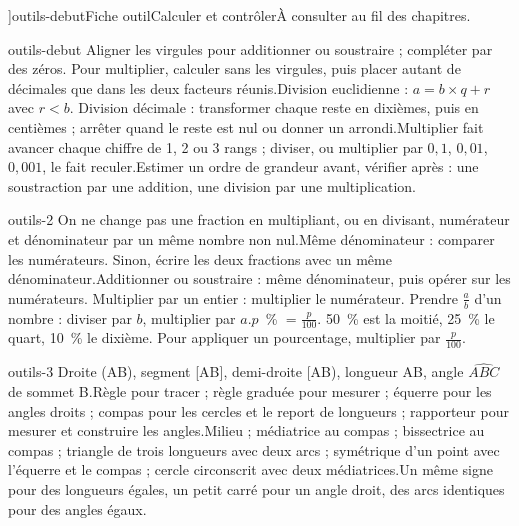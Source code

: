 \editionPage[\pdfbookmark[0]{Fiches outils}{bm-outils-debut-parent}]{outils-debut}{Fiche outil}{Calculer et contrôler}{À consulter au fil des chapitres.}
\begin{blocEdition}{outils-debut}
Aligner les virgules pour additionner ou soustraire ; compléter par des zéros. Pour multiplier, calculer sans les virgules, puis placer autant de décimales que dans les deux facteurs réunis.Division euclidienne : $a=b\times q+r$ avec $r<b$. Division décimale : transformer chaque reste en dixièmes, puis en centièmes ; arrêter quand le reste est nul ou donner un arrondi.Multiplier fait avancer chaque chiffre de 1, 2 ou 3 rangs ; diviser, ou multiplier par $0{,}1$, $0{,}01$, $0{,}001$, le fait reculer.Estimer un ordre de grandeur avant, vérifier après : une soustraction par une addition, une division par une multiplication.
\end{blocEdition}
\begin{blocEdition}{outils-2}
On ne change pas une fraction en multipliant, ou en divisant, numérateur et dénominateur par un même nombre non nul.Même dénominateur : comparer les numérateurs. Sinon, écrire les deux fractions avec un même dénominateur.Additionner ou soustraire : même dénominateur, puis opérer sur les numérateurs. Multiplier par un entier : multiplier le numérateur. Prendre $\frac ab$ d’un nombre : diviser par $b$, multiplier par $a$.$p$~\% $=\frac p{100}$. 50~\% est la moitié, 25~\% le quart, 10~\% le dixième. Pour appliquer un pourcentage, multiplier par $\frac p{100}$.
\end{blocEdition}
\begin{blocEdition}{outils-3}
Droite (AB), segment [AB], demi-droite [AB), longueur AB, angle $\widehat{ABC}$ de sommet B.Règle pour tracer ; règle graduée pour mesurer ; équerre pour les angles droits ; compas pour les cercles et le report de longueurs ; rapporteur pour mesurer et construire les angles.Milieu ; médiatrice au compas ; bissectrice au compas ; triangle de trois longueurs avec deux arcs ; symétrique d’un point avec l’équerre et le compas ; cercle circonscrit avec deux médiatrices.Un même signe pour des longueurs égales, un petit carré pour un angle droit, des arcs identiques pour des angles égaux.
\end{blocEdition}
